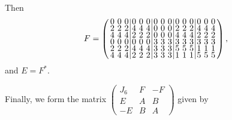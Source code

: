 \documentclass[../../main]{subfiles}
\begin{document}
Then
\[
  F = \left(
    \arraycolsep=1.75pt\def\arraystretch{0.5}
    \begin{array}{ccc|ccc|ccc|ccc|ccc}
      0&0&0&0&0&0&0&0&0&0&0&0&0&0&0\\
      2&2&2&4&4&4&0&0&0&2&2&2&4&4&4\\
      4&4&4&2&2&2&0&0&0&4&4&4&2&2&2\\
      0&0&0&0&0&0&3&3&3&3&3&3&3&3&3\\
      2&2&2&4&4&4&3&3&3&5&5&5&1&1&1\\
      4&4&4&2&2&2&3&3&3&1&1&1&5&5&5\\
    \end{array}
  \right),
\]
and $E=F^*$.

Finally, we form the matrix
$
\left(
  \begin{smallmatrix}
    J_6 & F & -F \\
    E & A & B \\
    -E & B & A
  \end{smallmatrix}
\right) 
$
given by
\end{document}
